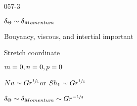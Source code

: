 \begin{mitframe}{057-3}
\begin{listone}
		\item $\blthick_{\dimltemp}\sim\blthick_{Momentum}$
        \item Bouyancy, viscous, and intertial important
        \item Stretch coordinate
        	\begin{listtwo}
				\item $\mass=0, n=0, p=0$
			\end{listtwo}
		\item $\nusselt\sim\grashof^{\sfrac{1}{4}}$or $\sherwood_1\sim\grashof^{\sfrac{1}{4}}$
 		\item $\blthick_{\dimltemp}\sim\blthick _{Momentum}\sim\grashof^{-\sfrac{1}{4}}$       
 \end{listone}

\end{mitframe}